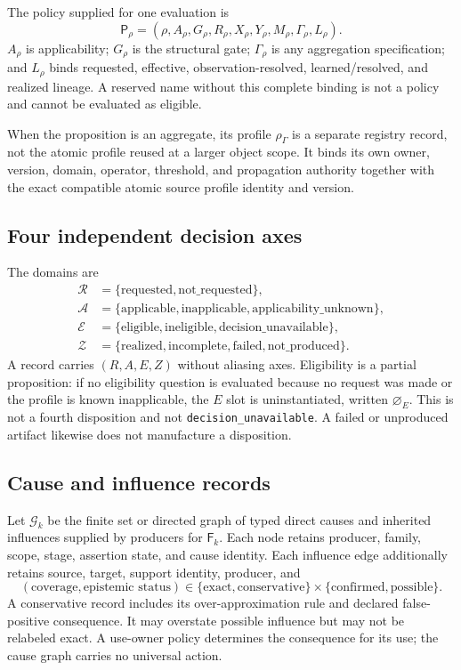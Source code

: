 The policy supplied for one evaluation is
\[
 \mathsf P_\rho=(\rho,A_\rho,G_\rho,R_\rho,X_\rho,Y_\rho,M_\rho,
                  \Gamma_\rho,L_\rho).
\]
$A_\rho$ is applicability; $G_\rho$ is the structural gate;
$\Gamma_\rho$ is any aggregation specification; and $L_\rho$ binds requested,
effective, observation-resolved, learned/resolved, and realized lineage. A
reserved name without this complete binding is not a policy and cannot be
evaluated as eligible.

When the proposition is an aggregate, its profile $\rho_\Gamma$ is a
separate registry record, not the atomic profile reused at a larger object
scope. It binds its own owner, version, domain, operator, threshold, and
propagation authority together with the exact compatible atomic source
profile identity and version.

\subsection{Four independent decision axes}

The domains are
\begin{align*}
 \mathcal R&=\{\mathrm{requested},\mathrm{not\_requested}\},\\
 \mathcal A&=\{\mathrm{applicable},\mathrm{inapplicable},
                    \mathrm{applicability\_unknown}\},\\
 \mathcal E&=\{\mathrm{eligible},\mathrm{ineligible},
                    \mathrm{decision\_unavailable}\},\\
 \mathcal Z&=\{\mathrm{realized},\mathrm{incomplete},\mathrm{failed},
                    \mathrm{not\_produced}\}.
\end{align*}
A record carries $(R,A,E,Z)$ without aliasing axes. Eligibility is a partial
proposition: if no eligibility question is evaluated because no request was
made or the profile is known inapplicable, the $E$ slot is uninstantiated,
written $\varnothing_E$. This is not a fourth disposition and not
\texttt{decision\_unavailable}. A failed or unproduced artifact likewise does
not manufacture a disposition.

\subsection{Cause and influence records}

Let $\mathcal G_k$ be the finite set or directed graph of typed direct causes
and inherited influences supplied by producers for $\mathsf F_k$. Each node
retains producer, family, scope, stage, assertion state, and cause identity.
Each influence edge additionally retains source, target, support identity,
producer, and
\[
 (\text{coverage},\text{epistemic status})\in
 \{\mathrm{exact},\mathrm{conservative}\}\times
 \{\mathrm{confirmed},\mathrm{possible}\}.
\]
A conservative record includes its over-approximation rule and declared
false-positive consequence. It may overstate possible influence but may not
be relabeled exact. A use-owner policy determines the consequence for its
use; the cause graph carries no universal action.
